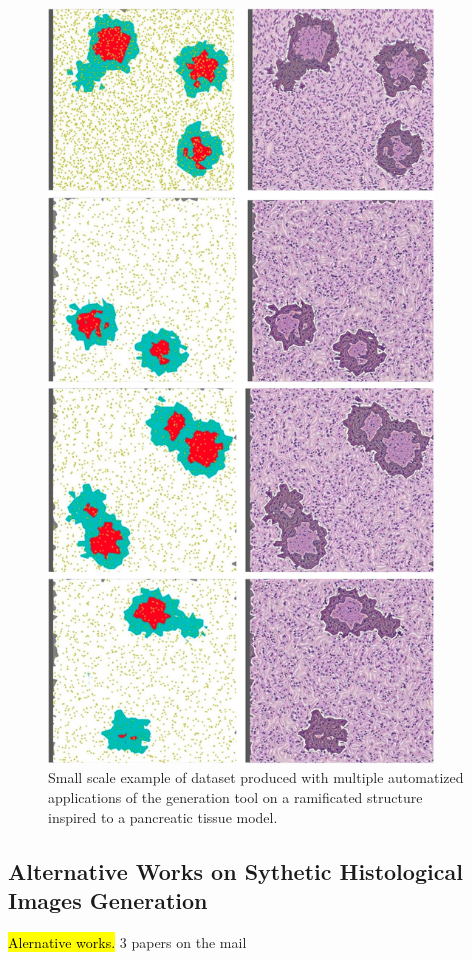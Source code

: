     \begin{figure}
        \centering
        \includegraphics[height=20cm,keepaspectratio]{images/dataset}
        \caption{Small scale example of dataset produced with multiple automatized applications of the generation tool on a ramificated structure inspired to a pancreatic tissue model.}
        \label{fig:dataset}
    \end{figure}

\subsection{Alternative Works on Sythetic Histological Images Generation}
\hl{Alernative works.}
3 papers on the mail
